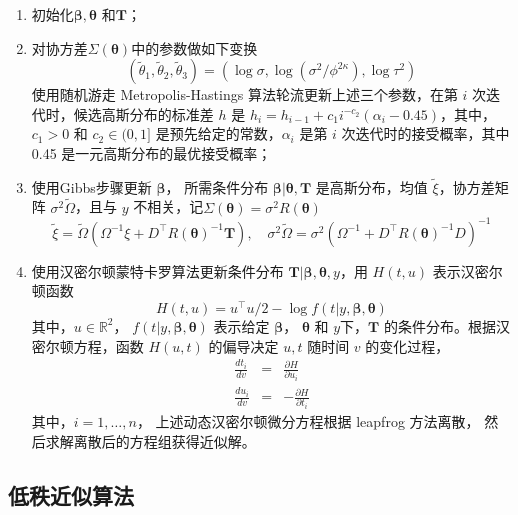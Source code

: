 \documentclass[12pt,a4paper,UTF8,twoside]{book}
\providecommand{\tightlist}{%
  \setlength{\itemsep}{0pt}\setlength{\parskip}{0pt}}
\theoremstyle{definition}
\theoremstyle{definition}
\theoremstyle{definition}
\theoremstyle{remark}
\begin{document}
\begin{enumerate}
\def\labelenumi{\arabic{enumi}.}
\tightlist
\item
  初始化\(\boldsymbol{\beta}, \boldsymbol{\theta}\) 和\(\mathbf{T}\)；
\item
  对协方差\(\Sigma(\boldsymbol{\theta})\)中的参数做如下变换
  \citep{Christensen2006}
  \[(\tilde{\theta}_{1}, \tilde{\theta}_{2}, \tilde{\theta}_{3}) = (\log \sigma, \log (\sigma^2/\phi^{2\kappa}), \log \tau^2)\]
  使用随机游走 Metropolis-Hastings 算法轮流更新上述三个参数，在第 \(i\)
  次迭代时，候选高斯分布的标准差 \(h\) 是
  \(h_{i} = h_{i-1} + c_{1}i^{-c_{2}}(\alpha_{i}-0.45)\)，其中，\(c_{1} > 0\)
  和 \(c_{2} \in (0,1]\) 是预先给定的常数，\(\alpha_i\) 是第 \(i\)
  次迭代时的接受概率，其中 0.45 是一元高斯分布的最优接受概率；
\item
  使用Gibbs步骤更新 \(\boldsymbol{\beta}\)， 所需条件分布
  \(\boldsymbol{\beta}|\boldsymbol{\theta},\mathbf{T}\) 是高斯分布，均值
  \(\tilde{\xi}\)，协方差矩阵 \(\sigma^2\tilde{\Omega}\)，且与 \(y\)
  不相关，记\(\Sigma(\boldsymbol{\theta}) = \sigma^2 R(\boldsymbol{\theta})\)
  \[ \tilde{\xi}  =  \tilde{\Omega}(\Omega^{-1}\xi+D^{\top} R(\boldsymbol{\theta})^{-1} \mathbf{T}), \quad \sigma^2 \tilde{\Omega}  =  \sigma^2(\Omega^{-1} + D^{\top} R(\boldsymbol{\theta})^{-1} D)^{-1} \]
\item
  使用汉密尔顿蒙特卡罗算法更新条件分布
  \(\mathbf{T}|\boldsymbol{\beta},\boldsymbol{\theta},y\)，用 \(H(t,u)\)
  表示汉密尔顿函数
  \[H(t, u) = u^{\top} u/2 - \log f(t | y, \boldsymbol{\beta}, \boldsymbol{\theta})\]
  \noindent 其中，\(u\in\mathbb{R}^2\)，
  \(f(t | y, \boldsymbol{\beta}, \boldsymbol{\theta})\) 表示给定
  \(\boldsymbol{\beta}\)， \(\boldsymbol{\theta}\) 和
  \(y\)下，\(\mathbf{T}\) 的条件分布。根据汉密尔顿方程，函数 \(H(u, t)\)
  的偏导决定 \(u,t\) 随时间 \(v\) 的变化过程， \begin{eqnarray*}
  \frac{d t_{i}}{d v} & = & \frac{\partial H}{\partial u_{i}} \\
  \frac{d u_{i}}{d v} & = & -\frac{\partial H}{\partial t_{i}}
  \end{eqnarray*} \noindent 其中，\(i = 1,\ldots, n\)，
  上述动态汉密尔顿微分方程根据 leapfrog 方法\citep{Brooks2011}离散，
  然后求解离散后的方程组获得近似解。
\end{enumerate}

\hypertarget{LowRank}{%
\subsection{低秩近似算法}\label{LowRank}}
\end{document}
